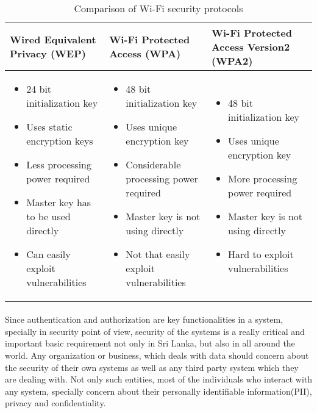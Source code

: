 \paragraph{}
\begin{center}
	\begin{table}[H]			
	\begin{tabu}  { | X[c] | X[c] | X[c] | }	
	\hline
	Wired Equivalent Privacy (WEP)& Wi-Fi Protected Access (WPA) & Wi-Fi Protected Access Version2 (WPA2) \\
	\hline
	\begin{itemize}
		\item 24 bit initialization key
		\item Uses static encryption keys
		\item Less processing power required
		\item Master key has to be used directly
		\item Can easily exploit vulnerabilities
	\end{itemize} & 
	\begin{itemize}
		\item 48 bit initialization key
		\item Uses unique encryption key
		\item Considerable processing power required
		\item Master key is not using directly
		\item Not that easily exploit vulnerabilities
	\end{itemize} &
	\begin{itemize}
		\item 48 bit initialization key
		\item Uses unique encryption key
		\item More processing power required
		\item Master key is not using directly
		\item Hard to exploit vulnerabilities
	\end{itemize}\\
		\hline
	\end{tabu}
\caption[Wi-Fi security protocol comparison]{Comparison of Wi-Fi security protocols}
\label{table:aimPt_isol}
	\end{table}
\end{center}


\paragraph{}
Since authentication and authorization are key functionalities in a system, specially in security point of view, security of the systems is a really critical and  important basic requirement not only in Sri Lanka, but also in all around the world. Any organization or business, which deals with data should concern about the security of their own systems as well as any third party system which they are dealing with. Not only such entities, most of the individuals who interact with any system, specially concern about their personally identifiable information(PII), privacy and confidentiality. 

